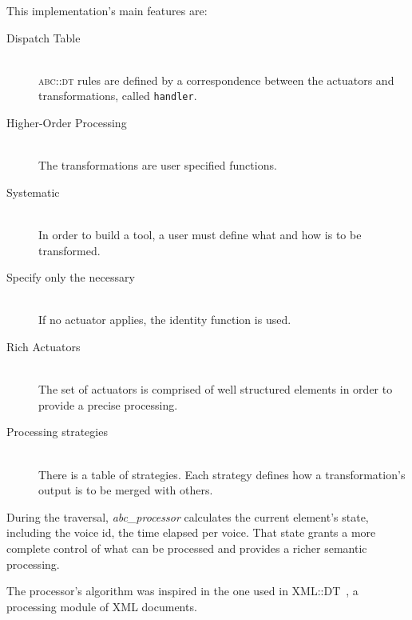 \documentclass[a4paper,UKenglish]{oasics}
\newcommand{\abcdt}{\textsc{abc::dt}}
\newcommand{\abcprocessor}{\emph{abc\_processor}}
\begin{document}
    This implementation's main features are:
    \begin{description}
      \item[Dispatch Table] \hfill \\
        \abcdt{} rules are defined by a correspondence between the actuators and transformations,
        called \texttt{handler}.
      \item[Higher-Order Processing] \hfill \\
        The transformations are user specified functions.
      \item[Systematic] \hfill \\
        In order to build a tool, a user must define what and how is to be transformed.
      \item[Specify only the necessary] \hfill \\
        If no actuator applies, the identity function is used.
      \item[Rich Actuators] \hfill \\
        The set of actuators is comprised of well structured elements in order to provide a precise
        processing.
      \item[Processing strategies] \hfill \\
        There is a table of strategies. Each strategy defines how a transformation's output is to be
        merged with others. 
    \end{description}

    During the traversal, \abcprocessor{} calculates the current element's state, including the
    voice id, the time elapsed per voice. That state grants a more complete control of what can be
    processed and provides a richer semantic processing.


    The processor's algorithm was inspired in the one used in XML::DT~\cite{tesejj}, a processing
    module of XML documents.
\end{document}
